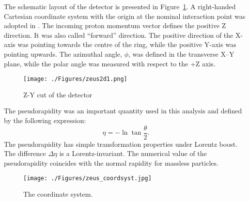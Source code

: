 The schematic layout of the \zeus detector is presented in Figure~\ref{fig:zeus2d1}. A right-handed Cartesian coordinate system with the origin at the nominal interaction point was adopted in \zeus. The incoming proton momentum vector defines the positive Z direction. It was also called ``forward'' direction. The positive direction of the X-axis was pointing towards the centre of the \hera ring, while the positive Y-axis was pointing upwards. The azimuthal angle, $\phi$, was defined in the transverse X--Y plane, while the polar angle was measured with respect to the +Z axis. 
\begin{landscape}
\begin{figure}[htpb]
	\centering
		\texttt{[image: ./Figures/zeus2d1.png]}
	\caption{Z-Y cut of the \zeus detector}
	\label{fig:zeus2d1}
\end{figure}
\end{landscape}

The pseudorapidity was an important quantity used in this analysis and defined by the following expression:
\begin{equation}
\eta = -\ln \tan \dfrac{\theta}{2}.
\end{equation}
The pseudorapidity has simple transformation properties under Lorentz boost. The difference $\Delta \eta$ is a Lorentz-invariant. The numerical value of the pseudorapidity coincides with the normal rapidity for massless particles.
\begin{figure}[htpb]
	\centering
		\texttt{[image: ./Figures/zeus\_coordsyst.jpg]}
	\caption{The \zeus coordinate system.}
	\label{fig:zeus_coordsyst}
\end{figure}
